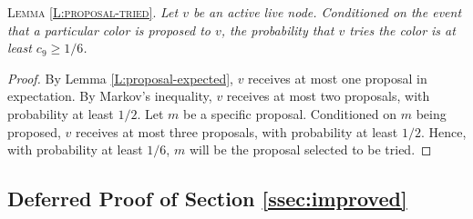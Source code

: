 \textsc{Lemma \ref{L:proposal-tried}.} \emph{Let $v$ be an active live node.
  Conditioned on the event that a particular color is proposed to $v$, the probability that $v$ \emph{tries} the color is at least $c_9 \ge 1/6$.}
\begin{proof}
By Lemma \ref{L:proposal-expected}, $v$ receives at most one proposal in expectation.
By Markov's inequality, $v$ receives at most two proposals, with probability at least $1/2$. Let $m$ be a specific proposal. 
Conditioned on $m$ being proposed, $v$ receives at most three proposals, with probability at least $1/2$. Hence, with probability at least $1/6$, $m$ will be the proposal selected to be tried.
\end{proof}


\subsection{Deferred Proof of Section \ref{ssec:improved}}
\label{app:improved}

